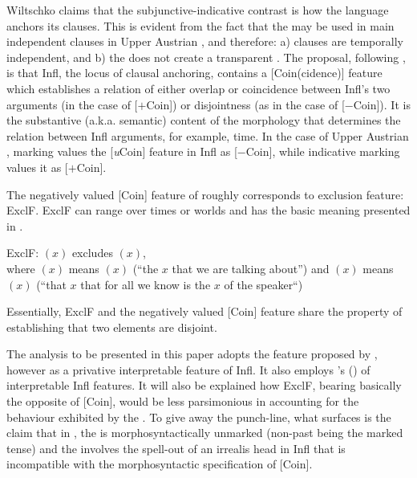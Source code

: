 \documentclass[output=paper,modfonts,newtxmath,hidelinks,]{langscibook}
\begin{document}
\noindent Wiltschko claims that the subjunctive-indicative contrast is how the language anchors its clauses. This is evident from the fact that the  may be used in main independent clauses in Upper Austrian , and therefore: a)  clauses are temporally independent, and b) the  does not create a transparent . The proposal, following \citet{RitterWiltschko2005,RitterWiltschko2009}, is that Infl, the locus of clausal anchoring, contains a [Coin(cidence)] feature which establishes a relation of either overlap or coincidence between Infl’s two arguments (in the case of [$+$Coin]) or disjointness (as in the case of [$-$Coin]). It is the substantive (a.k.a. semantic) content of the morphology that determines the relation between Infl arguments, for example, time. In the case of Upper Austrian ,  marking values the [\textit{u}Coin] feature in Infl as [$-$Coin], while indicative marking values it as [$+$Coin].\largerpage

The negatively valued [Coin] feature of \citet{RitterWiltschko2005,RitterWiltschko2014} roughly corresponds to   exclusion feature: ExclF. ExclF can range over times or worlds and has the basic meaning presented in .

\newpage 
\ea \label{10:ex21}
ExclF: $(x)$ excludes $(x)$,\\where {}$(x)$ means $(x)$ (“the $x$ that we are talking about”) and $(x)$ means $(x)$ (“that $x$ that for all we know is the $x$ of the speaker“)
    \hfill \citep[246]{Iatridou2000}
	\z
\z

\noindent Essentially, ExclF and the negatively valued [Coin] feature share the property of establishing that two elements are disjoint.

The analysis to be presented in this paper adopts the feature proposed by \citet{RitterWiltschko2005,RitterWiltschko2009}, however as a privative interpretable feature of Infl. It also employs \citeauthor{Cowper2002}'s (\citeyear{Cowper2002,Cowper2005})  of interpretable Infl features. It will also be explained how ExclF, bearing basically the opposite  of [Coin], would be less parsimonious in accounting for the behaviour exhibited by the  . To give away the punch-line, what surfaces is the claim that in , the  is morphosyntactically unmarked (non-past being the marked tense) and the   involves the spell-out of an irrealis head in Infl that is incompatible with the morphosyntactic specification of [Coin]. 
\end{document}
